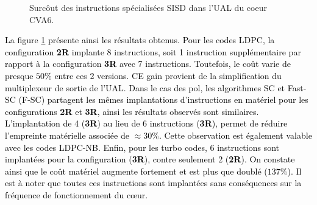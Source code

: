 \documentclass[../main.tex]{subfiles}
\begin{document}
\begin{figure}
    \center
    \caption{Surcôut des instructions spécialisées SISD dans l'UAL du coeur CVA6.}
    \label{tikz:alu_sisd}
\end{figure}
\textcolor{black}{La figure \ref{tikz:alu_sisd} présente ainsi les résultats obtenus. 
Pour les codes LDPC, la configuration \textbf{2R} implante 8 instructions, soit 1 instruction supplémentaire par rapport à la configuration \textbf{3R} avec 7 instructions. Toutefois, le coût varie de presque $50\%$ entre ces 2 versions. CE gain provient de la simplification du multiplexeur de sortie de l'UAL.
Dans le cas des \acrlong{pol}, les algorithmes SC et Fast-SC (F-SC) partagent les mêmes implantations d'instructions en matériel pour les configurations \textbf{2R} et \textbf{3R}, ainsi les résultats observés sont similaires. L'implantation de 4 (\textbf{3R}) au lieu de 6 instructions (\textbf{3R}), permet de réduire l'empreinte matérielle associée de $\approx 30\%$.
Cette observation est également valable avec les codes LDPC-NB.
Enfin, pour les turbo codes, 6 instructions sont implantées pour la configuration (\textbf{3R}), contre seulement 2 (\textbf{2R}). On constate ainsi que le coût matériel augmente fortement et est plus que doublé ($137\%$). 
Il est à noter que toutes ces instructions sont implantées sans conséquences sur la fréquence de fonctionnement du cœur.}
\end{document}

